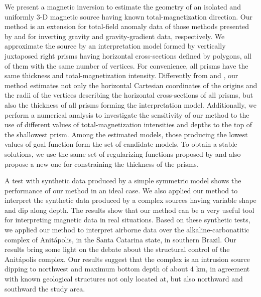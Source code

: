 We present a magnetic inversion to estimate the geometry of an isolated 
and uniformly 3-D magnetic source having known total-magnetization direction.
Our method is an extension for total-field anomaly data of those methods presented 
by \cite{oliveirajr-etal2011} and \cite{oliveirajr-barbosa2013} for inverting 
gravity and gravity-gradient data, respectively. 
We approximate the source by an interpretation model formed by vertically juxtaposed 
right prisms having horizontal cross-sections defined by polygons, all
of them with the same number of vertices.
For convenience, all prisms have the same thickness and total-magnetization 
intensity.
Differently from \cite{oliveirajr-etal2011} and \cite{oliveirajr-barbosa2013}, 
our method estimates not only the horizontal Cartesian coordinates of the origins and the radii of the vertices describing the horizontal cross-sections of all prisms, but also the thickness of all 
prisms forming the interpretation model. Additionally, we perform a numerical analysis to investigate the sensitivity of our method to the use of different values of total-magnetization intensities and depths to the top 
of the shallowest prism. Among the estimated models, those producing the 
lowest values of goal function form the set of candidate models.
To obtain a stable solutions, we use the same set of regularizing functions proposed by 
\cite{oliveirajr-etal2011} and also propose a new one for constraining the 
thickness of the prisms. 

A test with synthetic data produced by a simple symmetric model shows the performance 
of our method in an ideal case. We also applied our method to interpret the synthetic 
data produced by a complex sources having variable shape and dip along depth. The 
results show that our method can be a very useful tool for interpreting magnetic data 
in real situations. Based on these synthetic tests, we applied our method 
to interpret airborne data over the alkaline-carbonatitic complex of 
Anit{\'a}polis, in the Santa Catarina state, in southern Brazil. Our results bring some light 
on the debate about the structural control of the Anit{\'a}polis complex. 
Our results suggest that the complex is an intrusion source dipping to northwest and maximum bottom depth of about 4 km, in agreement 
with known geological structures not only located at, but also northward and southward 
the study area.
